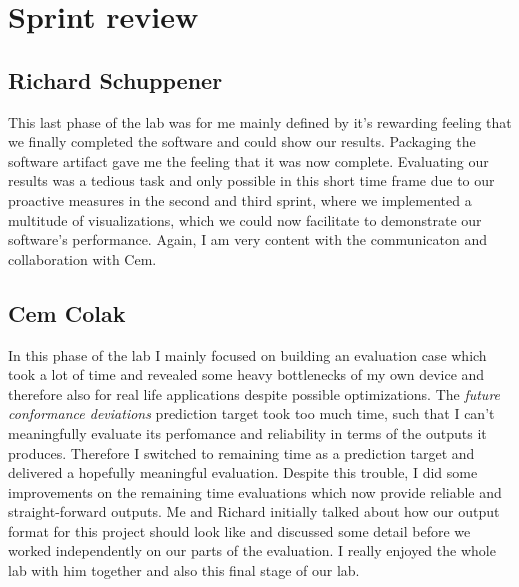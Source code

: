 \documentclass[12pt,a4paper]{article}
\begin{document}
\section{Sprint review}

\subsection{Richard Schuppener}
This last phase of the lab was for me mainly defined by it's rewarding feeling that we finally completed the software and could show our results. Packaging the software artifact gave me the feeling that it was now complete.
Evaluating our results was a tedious task and only possible in this short time frame due to our proactive measures in the second and third sprint, where we implemented a multitude of visualizations, which we could now facilitate to demonstrate our software's performance.
Again, I am very content with the communicaton and collaboration with Cem. 
\subsection{Cem Colak}
In this phase of the lab I mainly focused on building an evaluation case which took a lot of time and revealed some heavy bottlenecks of my own device and therefore also for real life applications despite possible optimizations. The \emph{future conformance deviations} prediction target took too much time, such that I can't meaningfully evaluate its perfomance and reliability in terms of the outputs it produces. Therefore I switched to remaining time as a prediction target and delivered a hopefully meaningful evaluation. Despite this trouble, I did some improvements on the remaining time evaluations which now provide reliable and straight-forward outputs. Me and Richard initially talked about how our output format for this project should look like and discussed some detail before we worked independently on our parts of the evaluation. I really enjoyed the whole lab with him together and also this final stage of our lab.
\end{document}
